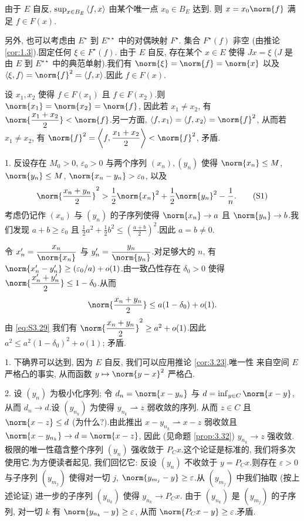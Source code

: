 
由于 $E$ 自反, $\sup_{x\in B_E}\left\langle f,x\right\rangle$ 由某个唯一点 $x_0\in B_E$ 达到.
则 $x=x_0\norm{f}$ 满足 $f\in F(x)$.

另外, 也可以考虑由 $E^\star$ 到 $E^{\star\star}$ 中的对偶映射 $F^\star$.
集合 $F^\star(f)$ 非空 (由推论  \ref{cor:1.3}).固定任何 $\xi\in F^\star(f)$.
由于 $E$ 自反, 存在某个 $x\in E$ 使得 $Jx=\xi$ ($J$ 是由 $E$ 到
$E^{\star\star}$ 中的典范单射).我们有 $\norm{\xi}=\norm{f}=\norm{x}$ 以及
$\dual{\xi}{f}=\norm{f}^2=\dual{f}{x}$.因此 $f\in F(x)$.

 设 $x_1,x_2$ 使得 $f\in F(x_1)$ 且 $f\in F(x_2)$.则
$\norm{x_1}=\norm{x_2}=\norm{f}$, 因此若 $x_1\ne x_2$, 有
$\norm{\dfrac{x_1+x_2}{2}}<\norm{f}$.另一方面,
$\dual{f}{x_1}=\dual{f}{x_2}=\norm{f}^2$, 从而若 $x_1\ne x_2$, 有
$\norm{f}^2=\dual{f}{\dfrac{x_1+x_2}{2}}<\norm{f}^2$, 矛盾.


1. 反设存在 $M_0>0$, $\varepsilon_0>0$ 与两个序列 $(x_n),(y_n)$ 使得
$\norm{x_n}\le M$, $\norm{y_n}\le M$, $\norm{x_n-y_n}>\varepsilon_0$, 以及
\begin{equation}
\norm{\frac{x_n+y_n}{2}}^2>\frac12\norm{x_n}^2+\frac12\norm{y_n}^2-\frac1n.
\tag{S1}
\label{eq:S3.29}
\end{equation}
考虑仍记作 $(x_n)$ 与 $(y_n)$ 的子序列使得 $\norm{x_n}\to a$ 且
$\norm{y_n}\to b$.我们发现 $a+b\ge\varepsilon_0$ 且
$\frac12a^2+\frac12b^2\le\left(\frac{a+b}{2}\right)^2$.因此 $a=b\ne0$.

令 $x'_n=\dfrac{x_n}{\norm{x_n}}$ 与 $y'_n=\dfrac{y_n}{\norm{y_n}}$.对足够大的
$n$, 有 $\norm{x'_n-y'_n}\ge(\varepsilon_0/a)+o(1)$.由一致凸性存在
$\delta_0>0$ 使得 $\norm{\dfrac{x'_n+y'_n}{2}}\le1-\delta_0$.从而
\begin{equation*}
\norm{\frac{x_n+y_n}{2}}\le a(1-\delta_0)+o(1).
\end{equation*}
由 \eqref{eq:S3.29} 我们有 $\norm{\dfrac{x_n+y_n}{2}}^2\ge a^2+o(1)$.因此
$a^2\le a^2(1-\delta_0)^2+o(1)$; 矛盾.


1. 下确界可以达到, 因为 $E$ 自反, 我们可以应用推论  \ref{cor:3.23}.唯一性
来自空间 $E$ 严格凸的事实, 从而函数 $y\mapsto\norm{y-x}^2$ 严格凸.

2. 设 $(y_n)$ 为极小化序列; 令 $d_n=\norm{x-y_n}$ 与 $d=\inf_{y\in C}\norm{x-y}$,
从而 $d_n\to d$.设 $(y_{n_k})$ 为使得 $y_{n_k}\rightharpoonup z$ 弱收敛的序列.
从而 $z\in C$ 且 $\norm{x-z}\le d$ (为什么?).由此推出
$x-y_{n_k}\rightharpoonup x-z$ 弱收敛且 $\norm{x-y_{n_k}}\to d=\norm{x-z}$,
因此 (见命题  \ref{prop:3.32}) $y_{n_k}\to z$ 强收敛.极限的唯一性蕴含整个序列
$(y_n)$ 强收敛于 $P_Cx$.这个论证是标准的, 我们将多次使用它.为方便读者起见,
我们回忆它: 反设 $(y_n)$ 不收敛于 $y=P_Cx$.则存在 $\varepsilon>0$ 与子序列
$(y_{m_j})$ 使得对一切 $j$, $\norm{y_{m_j}-y}\ge\varepsilon$.从 $(y_{m_j})$
中我们抽取 (按上述论证) 进一步的子序列 $(y_{n_k})$ 使得 $y_{n_k}\to P_Cx$.
由于 $(y_{n_k})$ 是 $(y_{m_j})$ 的子序列, 对一切 $k$ 有
$\norm{y_{n_k}-y}\ge\varepsilon$, 从而 $\norm{P_Cx-y}\ge\varepsilon$.矛盾.

